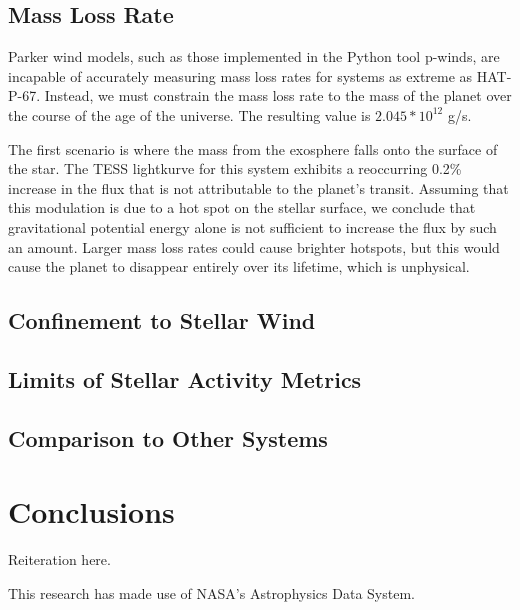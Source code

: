 \documentclass[twocolumn]{aastex631}
\begin{document}
\subsection{Mass Loss Rate}
Parker wind models, such as those implemented in the Python tool p-winds, are incapable of accurately measuring mass loss rates for systems as extreme as HAT-P-67. Instead, we must constrain the mass loss rate to the mass of the planet over the course of the age of the universe. The resulting value is $2.045*10^{12}$ g/s.

The first scenario is where the mass from the exosphere falls onto the surface of the star. The TESS lightkurve for this system exhibits a reoccurring 0.2\% increase in the flux that is not attributable to the planet’s transit. Assuming that this modulation is due to a hot spot on the stellar surface, we conclude that gravitational potential energy alone is not sufficient to increase the flux by such an amount. Larger mass loss rates could cause brighter hotspots, but this would cause the planet to disappear entirely over its lifetime, which is unphysical.

\subsection{Confinement to Stellar Wind}
\subsection{Limits of Stellar Activity Metrics}
\subsection{Comparison to Other Systems}
\section{Conclusions}

Reiteration here.

\clearpage
\pagebreak


\appendix


\begin{acknowledgements}
    This research has made use of NASA's Astrophysics Data System.
\end{acknowledgements}
\end{document}
